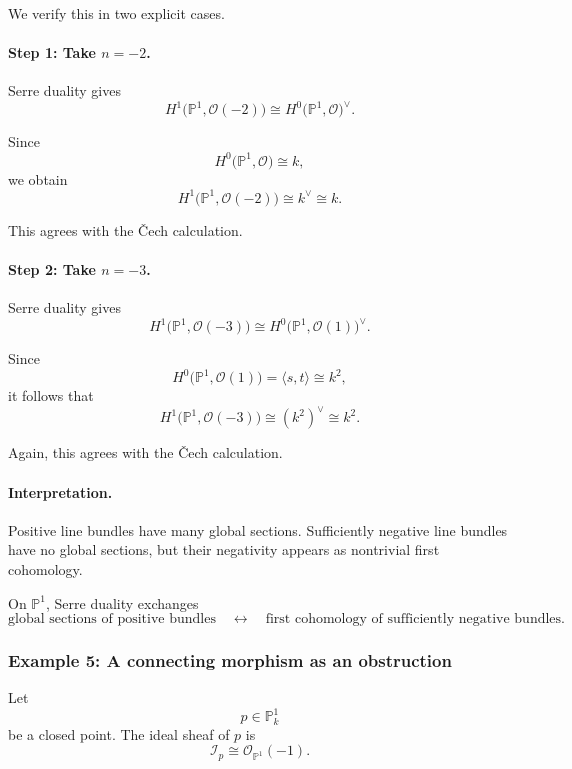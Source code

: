 \documentclass[12pt,a4paper]{article}
\theoremstyle{notespace}
\begin{document}
We verify this in two explicit cases.

\paragraph{Step 1: Take \(n=-2\).}

Serre duality gives
\[
H^{1}\bigl(\mathbb{P}^{1},\mathcal{O}(-2)\bigr)
\cong
H^{0}\bigl(\mathbb{P}^{1},\mathcal{O}\bigr)^{\vee}.
\]

Since
\[
H^{0}\bigl(\mathbb{P}^{1},\mathcal{O}\bigr)
\cong
k,
\]
we obtain
\[
H^{1}\bigl(\mathbb{P}^{1},\mathcal{O}(-2)\bigr)
\cong
k^{\vee}
\cong
k.
\]

This agrees with the Čech calculation.

\paragraph{Step 2: Take \(n=-3\).}

Serre duality gives
\[
H^{1}\bigl(\mathbb{P}^{1},\mathcal{O}(-3)\bigr)
\cong
H^{0}\bigl(\mathbb{P}^{1},\mathcal{O}(1)\bigr)^{\vee}.
\]

Since
\[
H^{0}\bigl(\mathbb{P}^{1},\mathcal{O}(1)\bigr)
=
\langle s,t\rangle
\cong
k^{2},
\]
it follows that
\[
H^{1}\bigl(\mathbb{P}^{1},\mathcal{O}(-3)\bigr)
\cong
(k^{2})^{\vee}
\cong
k^{2}.
\]

Again, this agrees with the Čech calculation.

\paragraph{Interpretation.}

Positive line bundles have many global sections. Sufficiently negative line
bundles have no global sections, but their negativity appears as nontrivial
first cohomology.

On \(\mathbb{P}^{1}\), Serre duality exchanges
\[
\boxed{
	\text{global sections of positive bundles}
	\quad\longleftrightarrow\quad
	\text{first cohomology of sufficiently negative bundles}.
}
\]

\subsubsection{Example 5: A connecting morphism as an obstruction}

Let
\[
p\in \mathbb{P}^{1}_{k}
\]
be a closed point. The ideal sheaf of \(p\) is
\[
\mathcal{I}_{p}\cong \mathcal{O}_{\mathbb{P}^{1}}(-1).
\]
\end{document}
